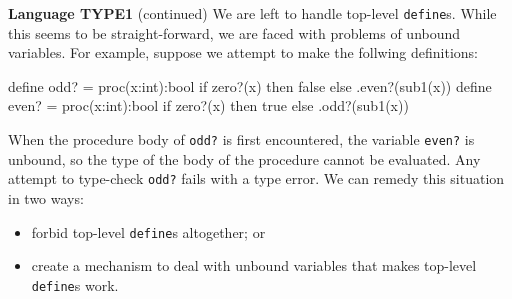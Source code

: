\begin{minipage}[t]{\sw}
\slidenumber
\LARGE
{\bf Language TYPE1} (continued)\exx
We are left to handle top-level \verb'define's.
While this seems to be straight-forward,
we are faced with problems of unbound variables.
For example,
suppose we attempt to make the follwing definitions:
\Large
\begin{qv}
define odd? =
  proc(x:int):bool if zero?(x) then false else .even?(sub1(x))
define even? =
  proc(x:int):bool if zero?(x) then true else .odd?(sub1(x))
\end{qv}
\LARGE
When the procedure body of \verb'odd?' is first encountered,
the variable \verb'even?' is unbound,
so the type of the body of the procedure cannot be evaluated.
Any attempt to type-check \verb'odd?' fails with a type error.\exx
We can remedy this situation in two ways:
\begin{itemize}
\item forbid top-level \verb'define's altogether; or
\item create a mechanism to deal with unbound variables
      that makes top-level \verb'define's work.
\end{itemize}
\end{minipage}

